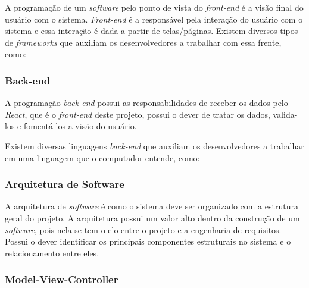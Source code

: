 A programação de um \textit{software} pelo ponto de vista do \textit{front-end} é a visão final do usuário com o sistema. \textit{Front-end} é a responsável pela interação do usuário com o sistema e essa interação é dada a partir de telas/páginas. Existem diversos tipos de \textit{frameworks} que auxiliam os desenvolvedores a trabalhar com essa frente, como:


\subsubsection{Back-end}
\label{sec:back-end}

A programação \textit{back-end} possui as responsabilidades de receber os dados pelo \textit{React}, que é o \textit{front-end} deste projeto, possui o dever de tratar os dados, valida-los e fomentá-los a visão do usuário.

Existem diversas linguagens \textit{back-end} que auxiliam os desenvolvedores a trabalhar em uma linguagem que o computador entende, como:


\subsubsection{Arquitetura de Software}

A arquitetura de \textit{software} é como o sistema deve ser organizado com a estrutura geral do projeto. A arquitetura possui um valor alto dentro da construção de um \textit{software}, pois nela se tem o elo entre o projeto e a engenharia de requisitos. Possui o dever identificar os principais componentes estruturais no sistema e o relacionamento entre eles.

\subsubsection{Model-View-Controller}
\label{sec:mvc}

